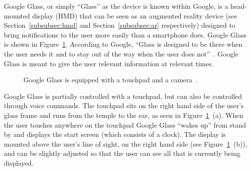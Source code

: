 Google Glass, or simply ``Glass'' as the device is known within Google, is a head-mounted display (HMD) that can be seen as an augmented reality device (see Section~\ref{subsubsec:hmd} and Section~\ref{subsubsec:ar} respectively) designed to bring notifications to the user more easily than a smartphone does. Google Glass is shown in Figure~\ref{GoogleGlassHardware}. According to Google, ``Glass is designed to be there when the user needs it and to stay out of the way when the user does not''~\cite{glassDesignPrinciples}. Google Glass is meant to give the user relevant information at relevant times.

	\begin{figure}[ht!]
		\centering
    \qquad
    \qquad
		\caption{Google Glass is equipped with a touchpad and a camera~\cite{ImagesGoogleGlassUI}.}
		\label{GoogleGlassHardware}
	\end{figure}

Google Glass is partially controlled with a touchpad, but can also be controlled through voice commands. The touchpad sits on the right hand side of the user's glass frame and runs from the temple to the ear, as seen in Figure~\ref{GoogleGlassHardware}~(a). When the user touches anywhere on the touchpad Google Glass ``wakes up'' from stand by and displays the start screen (which consists of a clock). The display is mounted above the user's line of sight, on the right hand side (see Figure~\ref{GoogleGlassHardware}~(b)), and can be slightly adjusted so that the user can see all that is currently being displayed.

